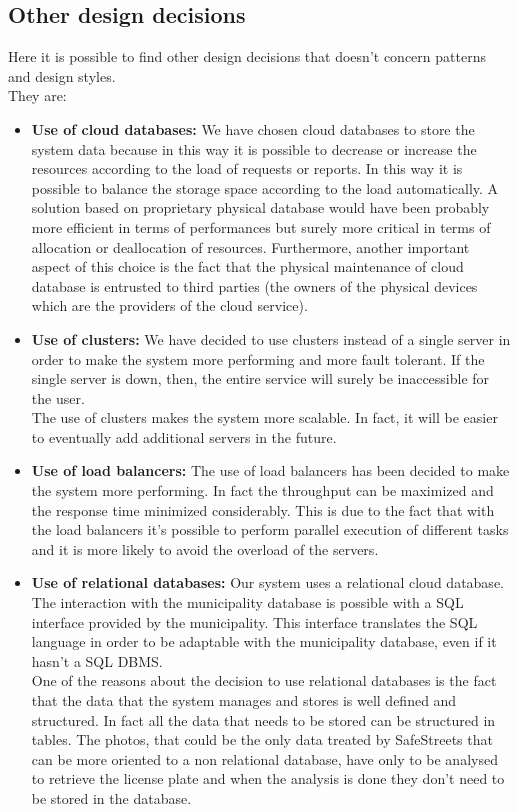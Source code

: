\documentclass[titlepage]{article}
\begin{document}
\subsection{Other design decisions}
Here it is possible to find other design decisions that doesn't concern patterns and design styles. \\
They are:
\begin{itemize}
	\item \textbf{ Use of cloud databases:} We have chosen cloud databases to store the system data because in this way it is possible to decrease or increase the resources according to the load of requests or reports. In this way it is possible to balance the storage space according to the load automatically. A solution based on proprietary physical database would have been probably more efficient in terms of performances but surely more critical in terms of allocation or deallocation of resources. Furthermore, another important aspect of this choice is the fact that the physical maintenance of cloud database is entrusted to third parties (the owners of the physical devices which are the providers of the cloud service).
	\item \textbf{Use of clusters:} We have decided to use clusters instead of a single server in order to make the system more performing and more fault tolerant. If the single server is down, then, the entire service will surely be inaccessible for the user. \\
The use of clusters makes the system more scalable. In fact, it will be easier to eventually add additional servers in the future.
	\item \textbf{Use of load balancers:} The use of load balancers has been decided to make the system more performing. In fact the throughput can be maximized and the response time minimized considerably. This is due to the fact that with the load balancers it's possible to perform parallel execution of different tasks and it is more likely to avoid the overload of the servers.  
	\item \textbf{Use of relational databases:} Our system uses a relational cloud database. The interaction with the municipality database is possible with a SQL interface provided by the municipality. This interface translates the SQL language in order to be adaptable with the municipality database, even if it hasn't a SQL DBMS.\\
One of the reasons about the decision to use relational databases is the fact that the data that the system manages and stores is well defined and structured. In fact all the data that needs to be stored can be structured in tables. The photos, that could be the only data treated by SafeStreets that can be more oriented to a non relational database, have only to be analysed to retrieve the license plate and when the analysis is done they don't need to be stored in the database.\\

\end{itemize}
\end{document}

